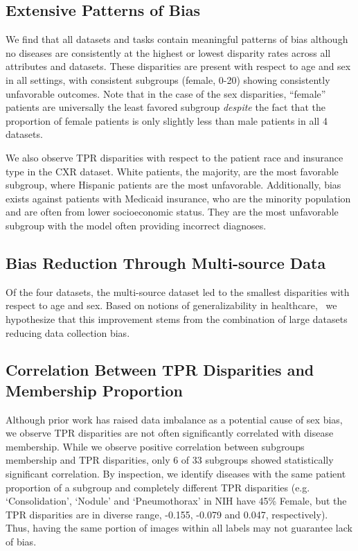 \documentclass{ws-procs11x85}
\begin{document}
\subsection{Extensive Patterns of Bias}
We find that all datasets and tasks contain meaningful patterns of bias although no diseases are consistently at the highest or lowest disparity rates across all attributes and datasets. These disparities are present with respect to age and sex in all settings, with consistent subgroups (female, 0-20) showing consistently unfavorable outcomes. Note that in the case of the sex disparities, ``female'' patients are universally the least favored subgroup \emph{despite} the fact that the proportion of female patients is only slightly less than male patients in all 4 datasets.



We also observe TPR disparities with respect to the patient race and insurance type in the CXR dataset.  White patients, the majority, are the most favorable subgroup, where Hispanic patients are the most unfavorable. Additionally, bias exists against patients with Medicaid insurance, who are the minority population and are often from lower socioeconomic status. They are the most unfavorable subgroup with the model often providing incorrect diagnoses. 













\subsection{Bias Reduction Through Multi-source Data}
Of the four datasets, the multi-source dataset led to the smallest disparities with respect to age and sex. Based on notions of generalizability in healthcare,~\cite{zech_confounding_2018,ghassemi2019practical} we hypothesize that this improvement stems from the combination of large datasets reducing data collection bias.

\subsection{Correlation Between TPR Disparities and Membership Proportion}
\label{sec:imbalance_data}
Although prior work has raised data imbalance as a potential cause of sex bias,~\cite{larrazabal2020gender} we observe TPR disparities are not often significantly correlated with disease membership. While we observe positive correlation between subgroups membership and TPR disparities, only 6 of 33 subgroups showed statistically significant correlation. By inspection, we identify diseases with the same patient proportion of a subgroup and completely different TPR disparities (e.g. `Consolidation', `Nodule' and `Pneumothorax' in NIH have 45\% Female, but the TPR disparities are in diverse range, -0.155, -0.079 and 0.047, respectively). Thus, having the same portion of images within all labels may not guarantee lack of bias.
\end{document}

